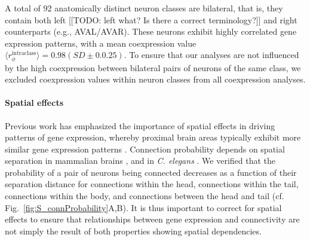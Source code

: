 \documentclass[10pt,letterpaper]{article}
\begin{document}
A total of 92 anatomically distinct neuron classes are bilateral, that is, they contain both left [[TODO: left what? Is there a correct terminology?]] and right counterparts (e.g., AVAL/AVAR).
These neurons exhibit highly correlated gene expression patterns, with a mean coexpression value $\langle r_\phi^{\mathrm{intraclass}} \rangle = 0.98 (SD\pm0.0.25)$.
To ensure that our analyses are not influenced by the high coexpression between bilateral pairs of neurons of the same class, we excluded coexpression values within neuron classes from all coexpression analyses.

\paragraph{Spatial effects}
Previous work has emphasized the importance of spatial effects in driving patterns of gene expression, whereby proximal brain areas typically exhibit more similar gene expression patterns \citep{Pantazatos:2016ir, Krienen2016, Fulcher:2016ck}.
Connection probability depends on spatial separation in mammalian brains \cite{Henderson:2014fg, Horvat:2016ia, Wang:2016gg, Markov:2013jo}, and in \emph{C. elegans} \cite{Azulay:2016cg}.
We verified that the probability of a pair of neurons being connected decreases as a function of their separation distance for connections within the head, connections within the tail, connections within the body, and connections between the head and tail (cf. Fig.~\ref{fig:S_connProbability}A,B).
It is thus important to correct for spatial effects to ensure that relationships between gene expression and connectivity are not simply the result of both properties showing spatial dependencies.
\end{document}
